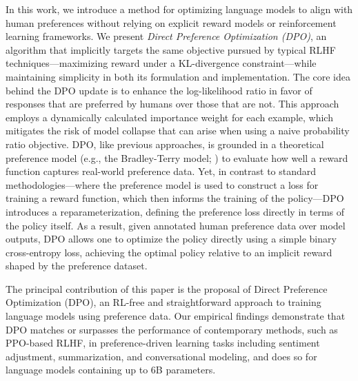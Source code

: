 In this work, we introduce a method for optimizing language models to align with human preferences without relying on explicit reward models or reinforcement learning frameworks. We present \textit{{Direct Preference Optimization} (DPO)}, an algorithm that implicitly targets the same objective pursued by typical RLHF techniques—maximizing reward under a KL-divergence constraint—while maintaining simplicity in both its formulation and implementation. The core idea behind the DPO update is to enhance the log-likelihood ratio in favor of responses that are preferred by humans over those that are not. This approach employs a dynamically calculated importance weight for each example, which mitigates the risk of model collapse that can arise when using a naive probability ratio objective. DPO, like previous approaches, is grounded in a theoretical preference model (e.g., the Bradley-Terry model; \cite{bradley1952rankanalysis}) to evaluate how well a reward function captures real-world preference data. Yet, in contrast to standard methodologies—where the preference model is used to construct a loss for training a reward function, which then informs the training of the policy—DPO introduces a reparameterization, defining the preference loss directly in terms of the policy itself. As a result, given annotated human preference data over model outputs, DPO allows one to optimize the policy directly using a simple binary cross-entropy loss, achieving the optimal policy relative to an implicit reward shaped by the preference dataset.

The principal contribution of this paper is the proposal of Direct Preference Optimization (DPO), an RL-free and straightforward approach to training language models using preference data. Our empirical findings demonstrate that DPO matches or surpasses the performance of contemporary methods, such as PPO-based RLHF, in preference-driven learning tasks including sentiment adjustment, summarization, and conversational modeling, and does so for language models containing up to 6B parameters.

